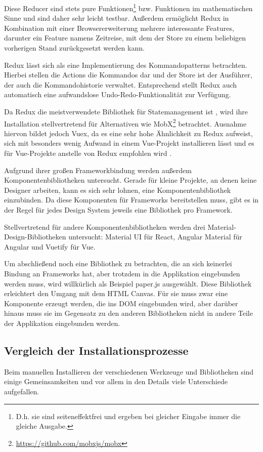 Diese Reducer sind stets pure Funktionen\footnote{D.h. sie sind seiteneffektfrei und ergeben bei gleicher Eingabe immer die gleiche Ausgabe.} bzw. Funktionen im mathematischen Sinne und sind daher sehr leicht testbar. Außerdem ermöglicht Redux in Kombination mit einer Browsererweiterung mehrere interessante Features, darunter ein Feature namens \glqq Zeitreise\grqq , mit dem der Store zu einem beliebigen vorherigen Stand zurückgesetzt werden kann.

Redux lässt sich als eine Implementierung des Kommandopatterns betrachten. Hierbei stellen die Actions die Kommandos dar und der Store ist der Ausführer, der auch die Kommandohistorie verwaltet. Entsprechend stellt Redux auch automatisch eine aufwandslose Undo-Redo-Funktionalität zur Verfügung.

Da Redux die meistverwendete Bibliothek für Statemanagement ist \cite{stateofjs}, wird ihre Installation stellvertretend für Alternativen wie MobX\footnote{\url{https://github.com/mobxjs/mobx}} betrachtet. Ausnahme hiervon bildet jedoch Vuex, da es eine sehr hohe Ähnlichkeit zu Redux aufweist, sich mit besonders wenig Aufwand in einem Vue-Projekt installieren lässt und es für Vue-Projekte anstelle von Redux empfohlen wird \cite{vuejs_docs:redux_vs_vuex}.

Aufgrund ihrer großen Frameworkbindung werden außerdem Komponentenbibliotheken untersucht. Gerade für kleine Projekte, an denen keine Designer arbeiten, kann es sich sehr lohnen, eine Komponentenbibliothek einzubinden. Da diese Komponenten für Frameworks bereitstellen muss, gibt es in der Regel für jedes Design System jeweils eine Bibliothek pro Framework.

Stellvertretend für andere Komponentenbibliotheken werden drei Material-Design-Bibliotheken untersucht: Material UI für React, Angular Material für Angular und Vuetify für Vue.

Um abschließend noch eine Bibliothek zu betrachten, die an sich keinerlei Bindung an Frameworks hat, aber trotzdem in die Applikation eingebunden werden muss, wird willkürlich als Beispiel paper.js ausgewählt. Diese Bibliothek erleichtert den Umgang mit dem HTML Canvas. Für sie muss zwar eine Komponente erzeugt werden, die ins \gls{DOM} eingebunden wird, aber darüber hinaus muss sie im Gegensatz zu den anderen Bibliotheken nicht in andere Teile der Applikation eingebunden werden.

\subsection{Vergleich der Installationsprozesse}
Beim manuellen Installieren der verschiedenen Werkzeuge und Bibliotheken sind einige Gemeinsamkeiten und vor allem in den Details viele Unterschiede aufgefallen.

